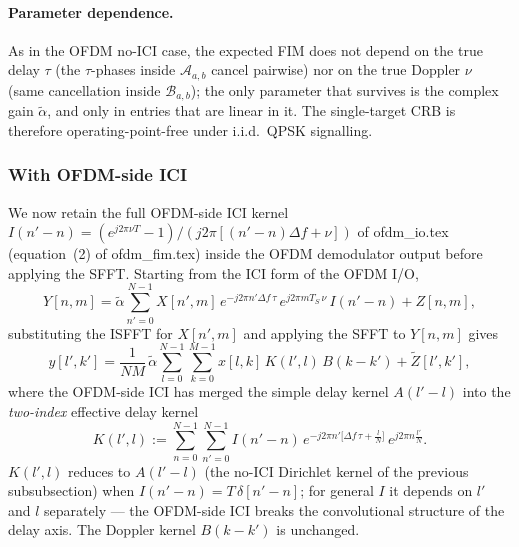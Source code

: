 \documentclass[11pt]{article}
\begin{document}
\paragraph{Parameter dependence.} As in the OFDM no-ICI case, the
expected FIM does not depend on the true delay \(\tau\) (the
\(\tau\)-phases inside \(\mathcal{A}_{a,b}\) cancel pairwise) nor on the
true Doppler \(\nu\) (same cancellation inside \(\mathcal{B}_{a,b}\));
the only parameter that survives is the complex gain \(\tilde{\alpha}\),
and only in entries that are linear in it. The single-target CRB is
therefore operating-point-free under i.i.d.\ QPSK signalling.

\subsubsection{With OFDM-side ICI}

We now retain the full OFDM-side ICI kernel
\(I(n'-n) = (e^{j2\pi\nu T}-1)/(j2\pi[(n'-n)\Delta f + \nu])\)
of ofdm\_io.tex (equation~(2) of ofdm\_fim.tex) inside the OFDM
demodulator output before applying the SFFT. Starting from the
ICI form of the OFDM I/O,
\begin{equation}
    Y[n,m] = \tilde{\alpha}\sum_{n'=0}^{N-1} X[n',m]\,
             e^{-j2\pi n'\Delta f\,\tau}\, e^{j2\pi mT_S\,\nu}\, I(n'-n)
             + Z[n,m],
\end{equation}
substituting the ISFFT for \(X[n',m]\) and applying the SFFT to
\(Y[n,m]\) gives
\begin{equation}
    y[l',k'] = \frac{1}{NM}\,\tilde{\alpha}\sum_{l=0}^{N-1}\sum_{k=0}^{M-1}
               x[l,k]\, K(l',l)\, B(k-k') + \tilde{Z}[l',k'],
\label{eq:OTFS_IO_ICI}
\end{equation}
where the OFDM-side ICI has merged the simple delay kernel
\(A(l'-l)\) into the \emph{two-index} effective delay kernel
\begin{equation}
    K(l',l) := \sum_{n=0}^{N-1}\sum_{n'=0}^{N-1} I(n'-n)\,
               e^{-j2\pi n'\bigl[\Delta f\,\tau + \tfrac{l}{N}\bigr]}\,
               e^{j2\pi n\tfrac{l'}{N}}.
\end{equation}
\(K(l',l)\) reduces to \(A(l'-l)\) (the no-ICI Dirichlet kernel of the
previous subsubsection) when \(I(n'-n) = T\,\delta[n'-n]\); for general
\(I\) it depends on \(l'\) and \(l\) separately --- the OFDM-side ICI
breaks the convolutional structure of the delay axis. The Doppler
kernel \(B(k-k')\) is unchanged.
\end{document}
